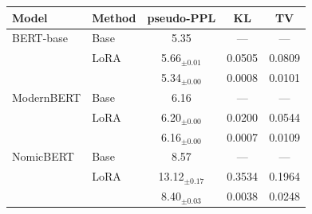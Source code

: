   \footnotesize\setlength{\tabcolsep}{4pt}
  \begin{tabular}{@{}llccc@{}}
    \toprule
    Model & Method & pseudo-PPL & KL & TV \\
    \midrule
    BERT-base & Base & 5.35 & --- & --- \\
     & LoRA & 5.66$_{\pm 0.01}$ & 0.0505 & 0.0809 \\
     & \PEAT{} & 5.34$_{\pm 0.00}$ & 0.0008 & 0.0101 \\
    ModernBERT & Base & 6.16 & --- & --- \\
     & LoRA & 6.20$_{\pm 0.00}$ & 0.0200 & 0.0544 \\
     & \PEAT{} & 6.16$_{\pm 0.00}$ & 0.0007 & 0.0109 \\
    NomicBERT & Base & 8.57 & --- & --- \\
     & LoRA & 13.12$_{\pm 0.17}$ & 0.3534 & 0.1964 \\
     & \PEAT{} & 8.40$_{\pm 0.03}$ & 0.0038 & 0.0248 \\
    \bottomrule
  \end{tabular}
